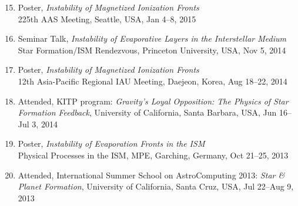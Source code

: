 \documentclass[11pt,letterpaper,roman]{moderncv}        %
\newenvironment{benumerate}[1]{
  \let\oldItem\item
  \def\item{\addtocounter{enumi}{-2}\oldItem}
  \begin{enumerate}[itemsep=0.0mm]
    \setcounter{enumi}{#1}
    \addtocounter{enumi}{1}
  }{
  \end{enumerate}
}
\begin{document}
\begin{benumerate}{14}
  Princeton University, USA, Oct 28, 2015
\item Poster, \textit{Instability of Magnetized Ionization Fronts}\\
  225th AAS Meeting, Seattle, USA, Jan 4--8, 2015
\item Seminar Talk, \textit{Instability of Evaporative Layers in the
    Interstellar Medium}\\ Star Formation/ISM Rendezvous, Princeton
  University, USA, Nov 5, 2014
\item Poster, \textit{Instability of Magnetized Ionization Fronts}\\
  12th Asia-Pacific Regional IAU Meeting, Daejeon, Korea, Aug 18--22,
  2014
\item Attended, KITP program: \textit{Gravity's Loyal Opposition: The
  Physics of Star Formation Feedback}, University of California, Santa
  Barbara, USA, Jun 16--Jul 3, 2014
\item Poster, \textit{Instability of Evaporation Fronts in the ISM}\\
  Physical Processes in the ISM, MPE, Garching, Germany, Oct 21--25,
  2013
\item Attended, International Summer School on AstroComputing 2013:
  \textit{Star \& Planet Formation}, University of California, Santa
  Cruz, USA, Jul 22--Aug 9, 2013
\end{benumerate}
\end{document}
